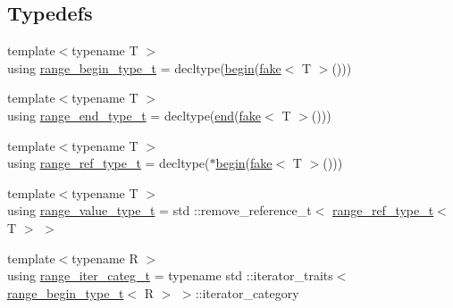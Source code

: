 \subsection*{Typedefs}
\begin{DoxyCompactItemize}
\item 
{\footnotesize template$<$typename T $>$ }\\using \mbox{\hyperlink{namespacerah_a28aff4eeddcece6be65ff0b956d32d4a}{range\+\_\+begin\+\_\+type\+\_\+t}} = decltype(\mbox{\hyperlink{namespacerah_acccec48f25fb1a805854818f05d7b616}{begin}}(\mbox{\hyperlink{namespacerah_aa659f5ae02cb923cd8813f96cfd86a25}{fake}}$<$ T $>$()))
\item 
{\footnotesize template$<$typename T $>$ }\\using \mbox{\hyperlink{namespacerah_a9657e24ae477f4482225b133fe286b65}{range\+\_\+end\+\_\+type\+\_\+t}} = decltype(\mbox{\hyperlink{namespacerah_a20a3e45aee90bb5534a00c6b14e06069}{end}}(\mbox{\hyperlink{namespacerah_aa659f5ae02cb923cd8813f96cfd86a25}{fake}}$<$ T $>$()))
\item 
{\footnotesize template$<$typename T $>$ }\\using \mbox{\hyperlink{namespacerah_a6622426bea22e9509614fe4c574ebeca}{range\+\_\+ref\+\_\+type\+\_\+t}} = decltype($\ast$\mbox{\hyperlink{namespacerah_acccec48f25fb1a805854818f05d7b616}{begin}}(\mbox{\hyperlink{namespacerah_aa659f5ae02cb923cd8813f96cfd86a25}{fake}}$<$ T $>$()))
\item 
{\footnotesize template$<$typename T $>$ }\\using \mbox{\hyperlink{namespacerah_a0c0c45ea6e732dc2668edfd0e4f8fccf}{range\+\_\+value\+\_\+type\+\_\+t}} = std \+::remove\+\_\+reference\+\_\+t$<$ \mbox{\hyperlink{namespacerah_a6622426bea22e9509614fe4c574ebeca}{range\+\_\+ref\+\_\+type\+\_\+t}}$<$ T $>$ $>$
\item 
{\footnotesize template$<$typename R $>$ }\\using \mbox{\hyperlink{namespacerah_a7cdcceefd4c7ad3abffb96560d24517d}{range\+\_\+iter\+\_\+categ\+\_\+t}} = typename std \+::iterator\+\_\+traits$<$ \mbox{\hyperlink{namespacerah_a28aff4eeddcece6be65ff0b956d32d4a}{range\+\_\+begin\+\_\+type\+\_\+t}}$<$ R $>$ $>$\+::iterator\+\_\+category
\end{DoxyCompactItemize}
